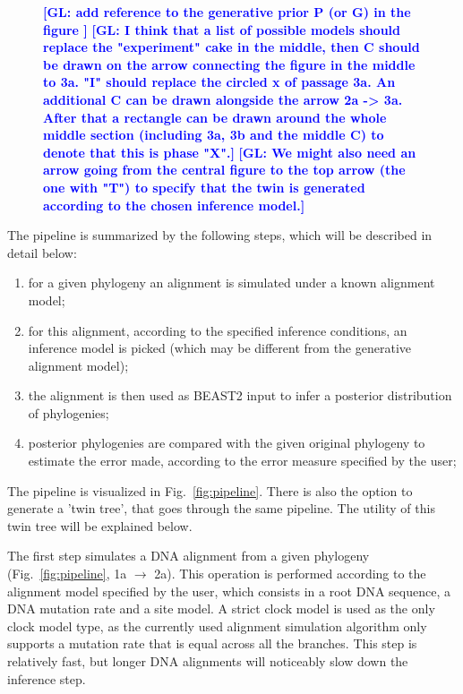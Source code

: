 \documentclass{article}
\newcommand{\giovanni}[1]{\textcolor{blue}{\textbf{[GL: #1]}}}
\begin{document}
\begin{figure}
  \giovanni{
    add reference to the generative prior P (or G) in the figure
  }
  \giovanni{
    I think that a list of possible models should replace the "experiment" 
    cake in the middle, then C should be drawn on the arrow 
    connecting the figure in the middle to 3a. 
    "I" should replace the circled x of passage 3a. 
    An additional C can be drawn alongside the arrow 2a -> 3a. 
    After that a rectangle can be drawn around the whole middle section 
    (including 3a, 3b and the middle C) to denote that this is phase "X".}
  \giovanni{We might also need an arrow going from the central figure to the top arrow (the one with "T") to specify that the twin is generated according to the chosen inference model.}
\end{figure}

The pipeline is summarized by the following steps, which will be described in detail below:
\begin{enumerate}
    \item for a given phylogeny an alignment is simulated under a known alignment model;
    \item for this alignment, according to the specified inference conditions, an inference model is picked (which may be different from the generative alignment model);
    \item the alignment is then used as BEAST2 input to infer a posterior distribution of phylogenies;
    \item posterior phylogenies are compared with the given original phylogeny to estimate the error made, according to the error measure specified by the user;
\end{enumerate}
The pipeline is visualized in Fig.~\ref{fig:pipeline}. 
There is also the option to generate a 'twin tree', 
that goes through the same pipeline. 
The utility of this twin tree will be explained below.

The first step simulates a DNA alignment from a given 
phylogeny (Fig.~\ref{fig:pipeline}, 1a $\rightarrow$ 2a).
This operation is performed according to the alignment model 
specified by the user, which consists in a root DNA sequence, 
a DNA mutation rate and a site model.
A strict clock model is used as the only clock model
type, as the currently used alignment simulation algorithm
only supports a mutation rate that is equal across all the branches.
This step is relatively fast, 
but longer DNA alignments will noticeably slow down the inference step.
\end{document}
